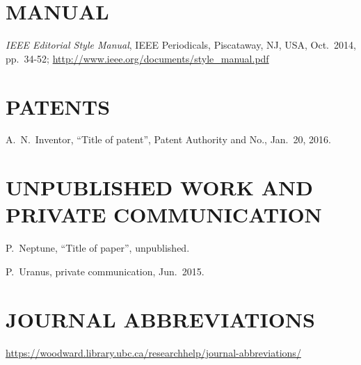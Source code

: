 \section{MANUAL}

\begin{thebibliography}{99} %
	\setcounter{enumi}{16}
		\emph{IEEE Editorial Style Manual},
		IEEE Periodicals,
		Piscataway, NJ, USA, Oct.\ 2014, pp.\ 34-52;
		\url{http://www.ieee.org/documents/style_manual.pdf} 
\end{thebibliography}

\section{PATENTS}

\begin{thebibliography}{99} %
	\setcounter{enumi}{17}
		A.~N.~Inventor,
		“Title of patent”,
		Patent Authority and No., Jan.\ 20, 2016.

\end{thebibliography}

\section{UNPUBLISHED WORK AND PRIVATE COMMUNICATION}

\begin{thebibliography}{99} %
	\setcounter{enumi}{18}
		P.~Neptune, “Title of paper”, unpublished.
	
	P.~Uranus, private communication, Jun.\ 2015.
\end{thebibliography}

\newpage

\section{JOURNAL ABBREVIATIONS}

\begin{thebibliography}{99} %
	\setcounter{enumi}{20}
		\url{https://woodward.library.ubc.ca/researchhelp/journal-abbreviations/}

\end{thebibliography}

